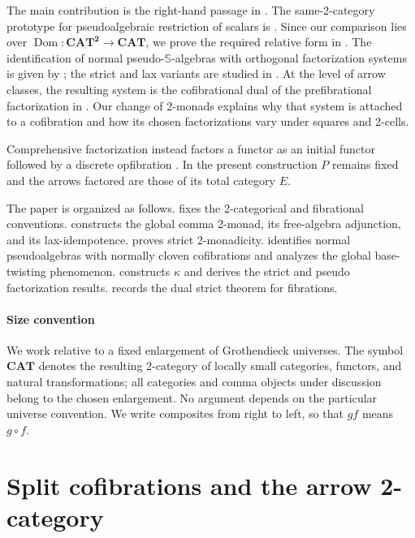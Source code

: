 \documentclass[11pt]{article}
\theoremstyle{plain}
\theoremstyle{definition}
\theoremstyle{remark}
\newcommand{\CAT}{\mathbf{CAT}}
\newcommand{\Dom}{\operatorname{Dom}}
\newcommand{\Sq}{\mathbb{S}}
\numberwithin{equation}{section}
\begin{document}
The main contribution is the right-hand passage in
.  The same-2-category prototype for
pseudoalgebraic restriction of scalars is
\citet[Theorem~A.7]{PerroneTholen2022}.  Since our comparison lies over
$\Dom\colon\CAT^{\mathbf 2}\to\CAT$, we prove the required relative
form in .  The identification of
normal pseudo-$\Sq$-algebras with orthogonal factorization systems is
given by \citet[Theorem~2.4]{KorostenskiTholen1993}; the strict and lax
variants are studied in
\citet{RosebrughWood2002Distributive,RosickyTholen2002}.  At the level of arrow
classes, the resulting system is the cofibrational dual of the
prefibrational factorization in
\citet[Section~3.7]{RosickyTholen2007}.  Our change
of 2-monads explains why that system is attached to a cofibration and
how its chosen factorizations vary under squares and 2-cells.

Comprehensive factorization instead factors a functor as an initial
functor followed by a discrete opfibration
\citep{StreetWalters1973}.  In the present construction $P$ remains
fixed and the arrows factored are those of its total category $E$.

The paper is organized as follows.   fixes the
2-categorical and fibrational conventions.   constructs
the global comma 2-monad, its free-algebra adjunction, and its
lax-idempotence.   proves strict 2-monadicity.
 identifies normal pseudoalgebras with normally
cloven cofibrations and analyzes the global base-twisting phenomenon.
 constructs $\kappa$ and derives the strict and
pseudo factorization results.   records the dual strict
theorem for fibrations.

\paragraph{Size convention}
We work relative to a fixed enlargement of Grothendieck universes.
The symbol $\CAT$ denotes the resulting 2-category of locally small
categories, functors, and natural transformations; all categories and
comma objects under discussion belong to the chosen enlargement.  No
argument depends on the particular universe convention.
We write composites from right to left, so that $gf$ means
$g\mathbin{\circ}f$.

\section{Split cofibrations and the arrow 2-category}
\label{sec:cofibrations}
\end{document}
